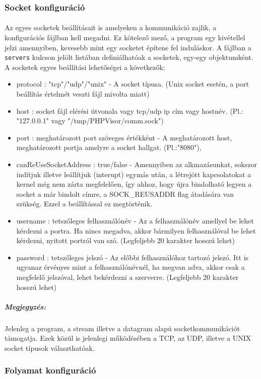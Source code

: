\documentclass[12pt]{report}
\begin{document}
  \subsubsection{Socket konfiguráció}
  \paragraph{} 
  Az egyes socketek beállításait is amelyeken a kommunikáció zajlik, a konfigurációs fájlban kell megadni. Ez kötelező mező, a program egy kivétellel jelzi amennyiben, kevesebb mint egy socketet építene fel induláskor. A fájlban a \verb|servers| kulcson jelölt listában definiálhatóak a socketek, egy-egy objektumként. A socketek egyes beállítási lehetőségei a következők:
  \begin{itemize}
  \item protocol : "tcp"/"udp"/"unix" - A socket típusa. (Unix socket esetén, a port beállítás értelmét veszti fájl mivolta miatt)
  \item host : socket fájl elérési útvonala vagy tcp/udp ip cím vagy hostnév. (Pl.: "127.0.0.1" vagy "/tmp/PHPVisor/comm.sock")
  \item port : meghatározott port szöveges értékként - A meghatározott host, meghatározott portja amelyre a socket hallgat. (Pl.:"8080"),
  \item canReUseSocketAddress : true/false - Amennyiben az alkmazásunkat, sokszor indítjuk illetve leállítjuk (interupt) egymás után, a létrejött kapcsolatokat a kernel még nem zárta megfelelően, így ahhoz, hogy újra bindolható legyen a socket a már bindolt címre, a SOCK\_REUSADDR flag átadására van szükség. Ezzel a beállítással ez megtörténik.
  \item username : tetszőleges felhasználónév - Az a felhasználónév amellyel be lehet kérdezni a portra. Ha nincs megadva, akkor bármilyen felhasználóval be lehet kérdezni, nyitott portról van szó. (Legfeljebb 20 karakter hosszú lehet)
  \item password : tetszőleges jelszó - Az előbbi felhasználóhoz tartozó jelszó. Itt is ugyanaz érvényes mint a felhasználónévnél, ha megvan adva, akkor csak a megfelelő jelszóval, lehet bekérdezni a szerverre. (Legfeljebb 20 karakter hosszú lehet)
  \end{itemize}
  \subparagraph{Megjegyzés:}
  Jelenleg a program, a stream illetve a datagram alapú socketkommunikációt támogatja. Ezek közül is jelenlegi működésében a TCP, az UDP, illetve a UNIX socket típusok választhatóak.
  \subsubsection{Folyamat konfiguráció}
\end{document}
